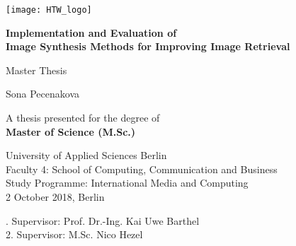 \begin{titlepage}
    \begin{center}
		\texttt{[image: HTW\_logo]}    
			
		\vspace{1cm}
        
        \Large
        \textbf{Implementation and Evaluation of \\ Image Synthesis Methods for Improving Image Retrieval}
        
        \vspace{0.5cm}
        \Large
        Master Thesis
        
        \vspace{1.5cm}
        
        Sona Pecenakova
        
        \vfill
        
        \normalsize
        A thesis presented for the degree of\\
        \textbf{Master of Science (M.Sc.)}

        
        \vspace{0.8cm}
        
        \large
        University of Applied Sciences Berlin\\
        \normalsize
		Faculty 4: School of Computing, Communication and Business\\
		Study Programme: International Media and Computing\\
		
		\vspace{0.8cm}
		2 October 2018, Berlin

        
    \end{center}

\vspace{1cm}
. Supervisor: Prof. Dr.-Ing. Kai Uwe Barthel\\
2. Supervisor: M.Sc. Nico Hezel\\
\end{titlepage}